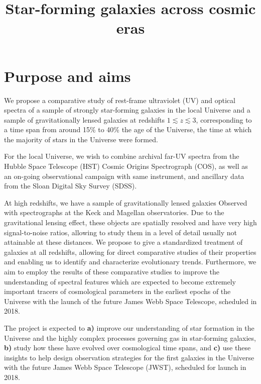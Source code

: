 \documentclass[12pt, a4paper]{scrartcl}
\date{}                                           %
\title{Star-forming galaxies across cosmic eras}
\begin{document}

\section{Purpose and aims}

We propose a comparative study of rest-frame ultraviolet (UV) and optical
spectra of a sample of strongly star-forming galaxies in the local Universe and
a sample of gravitationally lensed galaxies at redshifts $1 \lesssim z \lesssim
3$, corresponding to a time span from around 15\% to 40\% the age of the
Universe, the time at which the majority of stars in the Universe were formed. 

For the local Universe, we wish to combine archival far-UV spectra from the
Hubble Space Telescope (HST) Cosmic Origins Spectrograph (COS), as well as an
on-going observational campaign with same instrument, and ancillary data from
the Sloan Digital Sky Survey (SDSS). 

At high redshifts, we have a sample of gravitationally lensed galaxies Observed
with spectrographs at the Keck and Magellan observatories. Due to the
gravitational lensing effect, these objects are spatially resolved and have very
high signal-to-noise ratios, allowing to study them in a level of detail usually
not attainable at these distances. We propose to give a standardized treatment
of galaxies at all redshifts, allowing for direct comparative studies of their
properties and enabling us to identify and characterize evolutionary trends.
Furthermore, we aim to employ the results of these comparative studies to
improve the understanding of spectral features which are expected to become
extremely important tracers of cosmological parameters  in the earliest epochs
of the Universe with the launch of the future James Webb Space Telescope, 
scheduled in 2018. 

The project is expected to \textbf{a)} improve our understanding of star
formation in the Universe and the highly
complex processes governing gas in star-forming galaxies,
\textbf{b)} study how these have evolved over cosmological time spans, and
\textbf{c)} use these insights to help design observation strategies
for the first galaxies in the Universe with the future James Webb Space
Telescope (JWST), scheduled for launch in 2018.
\end{document}
